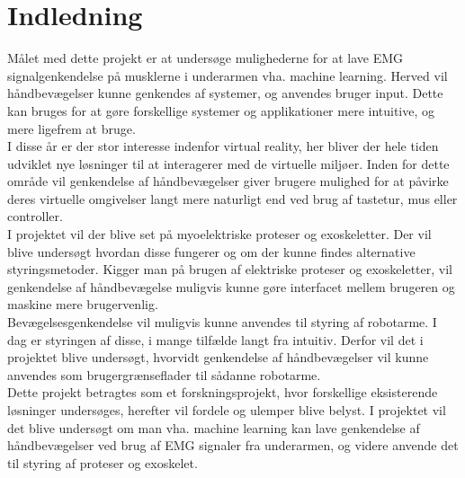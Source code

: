 \thispagestyle{fancy}
\chapter{Indledning}
\label{chp:indledning}
Målet med dette projekt er at undersøge mulighederne for at lave EMG signalgenkendelse på musklerne i underarmen vha. machine learning. Herved vil håndbevægelser kunne genkendes af systemer, og anvendes bruger input. Dette kan bruges for at gøre forskellige systemer og applikationer mere intuitive, og mere ligefrem at bruge.\\

I disse år er der stor interesse indenfor virtual reality, her bliver der hele tiden udviklet nye løsninger til at interagerer med de virtuelle miljøer. Inden for dette område vil genkendelse af håndbevægelser giver brugere mulighed for at påvirke deres virtuelle omgivelser langt mere naturligt end ved brug af tastetur, mus eller controller.\\


I projektet vil der blive set på myoelektriske proteser og exoskeletter. Der vil blive undersøgt hvordan disse fungerer og om der kunne findes alternative styringsmetoder.
Kigger man på brugen af elektriske proteser og exoskeletter, vil genkendelse af håndbevægelse muligvis kunne gøre interfacet mellem brugeren og maskine  mere brugervenlig.\\

Bevægelsesgenkendelse vil muligvis kunne anvendes til styring af robotarme. I dag er styringen af disse, i mange tilfælde langt fra intuitiv. Derfor vil det i projektet blive undersøgt, hvorvidt genkendelse af håndbevægelser vil kunne anvendes som brugergrænseflader til sådanne robotarme. \\

Dette projekt betragtes som et forskningsprojekt, hvor forskellige eksisterende løsninger undersøges, herefter vil fordele og ulemper blive belyst. I projektet vil det blive undersøgt om man vha. machine learning kan lave genkendelse af håndbevægelser ved brug af EMG signaler fra underarmen, og videre anvende det til styring af proteser og exoskelet.

%
%
%
%
